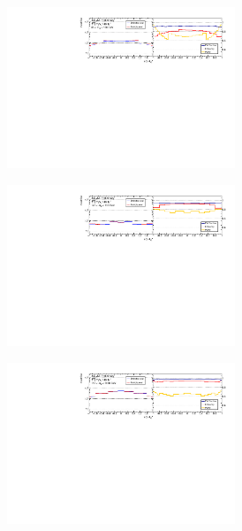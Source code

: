 \begin{figure}[htb]
    \centering 
    \begin{subfigure}{.99\textwidth}\centering
        \includegraphics[width = 0.75\textwidth]{Figures/m4l/UnfoldingStudies/v014_inputs/cosThetaStar1_m4l60-100inputs.pdf}
    \end{subfigure}
    \begin{subfigure}{.99\textwidth}\centering
        \includegraphics[width = 0.75\textwidth]{Figures/m4l/UnfoldingStudies/v014_inputs/cosThetaStar1_m4l120-130inputs.pdf}
    \end{subfigure}
    \begin{subfigure}{.99\textwidth}\centering
        \includegraphics[width = 0.75\textwidth]{Figures/m4l/UnfoldingStudies/v014_inputs/cosThetaStar1_m4l180-2000inputs.pdf}

\end{subfigure}
\end{figure}
